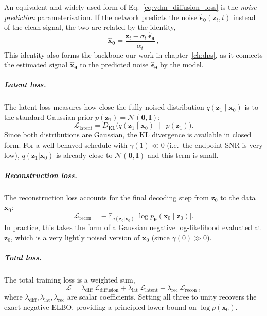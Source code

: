 An equivalent and widely used form of Eq.~\eqref{eq:vdm_diffusion_loss} is the \emph{noise prediction} parameterisation. If the network predicts the noise $\hat{\bm{\epsilon}}_{\bm{\theta}}(\bm{z}_t, t)$ instead of the clean signal, the two are related by the identity,
\begin{equation}
    \hat{\bm{x}}_{\bm{\theta}} = \frac{\bm{z}_t - \sigma_t\,\hat{\bm{\epsilon}}_{\bm{\theta}}}{\alpha_t}\,,
    \label{eq:tweedie}
\end{equation}
This identity also forms the backbone our work in chapter~\ref{ch:dps}, as it connects the estimated signal $\hat{\bm{x}}_{\bm{\theta}}$ to the predicted noise $\hat{\bm{\epsilon}}_{\bm{\theta}}$ by the model.

\subparagraph{Latent loss.}
The latent loss measures how close the fully noised distribution $q(\bm{z}_1 \mid \bm{x}_0)$ is to the standard Gaussian prior $p(\bm{z}_1) = \mathcal{N}(\bm{0}, \bm{I})$:
\begin{equation}
    \mathcal{L}_{\mathrm{latent}} = D_{\mathrm{KL}}\!\Big(q(\bm{z}_1 \mid \bm{x}_0)\;\big\|\;p(\bm{z}_1)\Big).
    \label{eq:latent_loss}
\end{equation}
Since both distributions are Gaussian, the KL divergence is available in closed form. For a well-behaved schedule with $\gamma(1) \ll 0$ (i.e.\ the endpoint SNR is very low), $q(\bm{z}_1|\bm{x}_0)$ is already close to $\mathcal{N}(\bm{0},\bm{I})$ and this term is small.

\subparagraph{Reconstruction loss.}
The reconstruction loss accounts for the final decoding step from $\bm{z}_0$ to the data $\bm{x}_0$:
\begin{equation}
    \mathcal{L}_{\mathrm{recon}} = -\,\mathbb{E}_{q(\bm{z}_0|\bm{x}_0)}\!\Big[\log p_{\bm{\theta}}(\bm{x}_0 \mid \bm{z}_0)\Big].
    \label{eq:recon_loss}
\end{equation}
In practice, this takes the form of a Gaussian negative log-likelihood evaluated at $\bm{z}_0$, which is a very lightly noised version of $\bm{x}_0$ (since $\gamma(0) \gg 0$).

\subparagraph{Total loss.} The total training loss is a weighted sum,
\begin{equation}
    \mathcal{L} = \lambda_{\mathrm{diff}}\,\mathcal{L}_{\mathrm{diffusion}} + \lambda_{\mathrm{lat}}\,\mathcal{L}_{\mathrm{latent}} + \lambda_{\mathrm{rec}}\,\mathcal{L}_{\mathrm{recon}}\,,
    \label{eq:total_loss}
\end{equation}
where $\lambda_{\mathrm{diff}}, \lambda_{\mathrm{lat}}, \lambda_{\mathrm{rec}}$ are scalar coefficients. Setting all three to unity recovers the exact negative ELBO, providing a principled lower bound on $\log p(\bm{x}_0)$.



